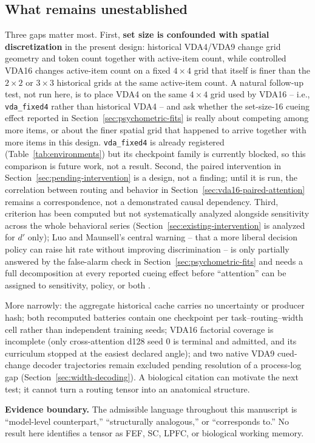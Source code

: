 \documentclass[11pt,a4paper]{article}
\newcommand{\boundary}[1]{\par\smallskip\noindent\colorbox{VdaLight}{\parbox{0.96\linewidth}{\textbf{Evidence boundary.} #1}}\par\smallskip}
\newcommand{\env}[1]{\texttt{#1}}
\begin{document}
\subsection{What remains unestablished}
Three gaps matter most. First, \textbf{set size is confounded with spatial discretization} in the present design: historical VDA4/VDA9 change grid geometry and token count together with active-item count, while controlled VDA16 changes active-item count on a fixed $4\times4$ grid that itself is finer than the $2\times2$ or $3\times3$ historical grids at the same active-item count. A natural follow-up test, not run here, is to place VDA4 on the same $4\times4$ grid used by VDA16 -- i.e., \env{vda\_fixed4} rather than historical VDA4 -- and ask whether the set-size-16 cueing effect reported in Section~\ref{sec:psychometric-fits} is really about competing among more items, or about the finer spatial grid that happened to arrive together with more items in this design. \env{vda\_fixed4} is already registered (Table~\ref{tab:environments}) but its checkpoint family is currently blocked, so this comparison is future work, not a result. Second, the paired intervention in Section~\ref{sec:pending-intervention} is a design, not a finding; until it is run, the correlation between routing and behavior in Section~\ref{sec:vda16-paired-attention} remains a correspondence, not a demonstrated causal dependency. Third, criterion has been computed but not systematically analyzed alongside sensitivity across the whole behavioral series (Section~\ref{sec:existing-intervention} is analyzed for $d'$ only); Luo and Maunsell's central warning -- that a more liberal decision policy can raise hit rate without improving discrimination -- is only partially answered by the false-alarm check in Section~\ref{sec:psychometric-fits} and needs a full decomposition at every reported cueing effect before ``attention'' can be assigned to sensitivity, policy, or both \citep{luo2018}.

More narrowly: the aggregate historical cache carries no uncertainty or producer hash; both recomputed batteries contain one checkpoint per task--routing--width cell rather than independent training seeds; VDA16 factorial coverage is incomplete (only cross-attention d128 seed 0 is terminal and admitted, and its curriculum stopped at the easiest declared angle); and two native VDA9 cued-change decoder trajectories remain excluded pending resolution of a process-log gap (Section~\ref{sec:width-decoding}). A biological citation can motivate the next test; it cannot turn a routing tensor into an anatomical structure. \boundary{The admissible language throughout this manuscript is ``model-level counterpart,'' ``structurally analogous,'' or ``corresponds to.'' No result here identifies a tensor as FEF, SC, LPFC, or biological working memory.}
\end{document}

